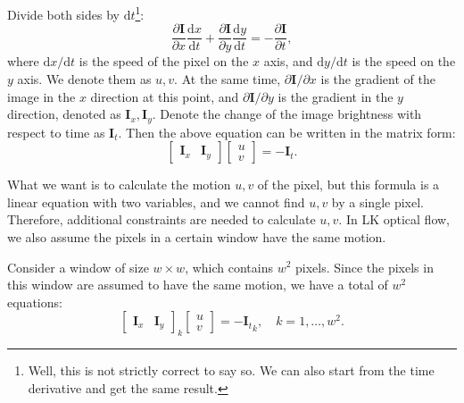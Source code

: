 Divide both sides by $\mathrm{d}t$\footnote{Well, this is not strictly correct to say so. We can also start from the time derivative and get the same result.}:
\begin{equation}\label{key}
 \frac{{\partial \mathbf{I} }}{{\partial x}} \frac{\mathrm{d}x}{\mathrm{d}t} + \frac{{\partial \mathbf{I}}}{{\partial y}} \frac{\mathrm{d}y}{\mathrm{d}t} =- \frac{{\partial \mathbf{I}}}{{\partial t}},
\end{equation}
where $\mathrm{d}x / \mathrm{d}t$ is the speed of the pixel on the $x$ axis, and $\mathrm{d}y/\mathrm{d}t$ is the speed on the $y$ axis. We denote them as $u,v$. At the same time, $\partial \mathbf{I}/{\partial x}$ is the gradient of the image in the $x$ direction at this point, and $\partial \mathbf{I}/{\partial y}$ is the gradient in the $y$ direction, denoted as $\mathbf{I} _x, \mathbf{I}_y$. Denote the change of the image brightness with respect to time as $\mathbf{I}_t$. Then the above equation can be written in the matrix form:
\begin{equation}
\left[ {\begin{array}{*{20}{c}}
	{{ \mathbf{I}_x}}&{{ \mathbf{I}_y}}
	\end{array}} \right]\left[ 
        \begin{array}{l}
        u\\
        v
        \end{array} \right] =  - {\mathbf{I}_t}.
\end{equation}

What we want is to calculate the motion $u,v$ of the pixel, but this formula is a linear equation with two variables, and we cannot find $u,v$ by a single pixel. Therefore, additional constraints are needed to calculate $u,v$. In LK optical flow, we also assume the pixels in a certain window have the same motion.

Consider a window of size $w \times w$, which contains $w^2$ pixels. Since the pixels in this window are assumed to have the same motion, we have a total of $w^2$ equations:
\begin{equation}
\left[ {\begin{array}{*{20}{c}}
	{{ \mathbf{I}_x}}&{{ \mathbf{I}_y}}
	\end{array}} \right]_k
\left[ \begin{array}{l}
u\\
v
\end{array} \right] =  - {\mathbf{I}_t}_k, \quad k=1, \ldots, w^2.
\end{equation}

